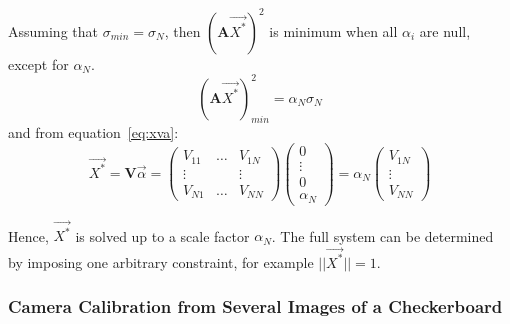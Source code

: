 \begin{algorithm}[!ht]
\begin{algorithmic}[1]
      \STATE Assuming that \(\sigma_{min} = \sigma_N\), then \((\textbf{A}\overrightarrow{X^*})^2\) is minimum when all $\alpha_i$ are null, except for $\alpha_N$.
      \begin{equation}
          (\textbf{A} \overrightarrow{X^*})_{min}^2 = \alpha_N \sigma_N
      \end{equation}
      and from equation~\ref{eq:xva}:
      \begin{equation}
          \overrightarrow{X^*} = 
          \textbf{V} \overrightarrow{\alpha} 
          = \begin{pmatrix} V_{11} & \dots & V_{1N} \\
           \vdots &  & \vdots \\
          V_{N1} & \dots & V_{NN}\end{pmatrix} \begin{pmatrix}0 \\ \vdots \\0 \\\alpha_N\end{pmatrix} 
          = \alpha_N \begin{pmatrix}V_{1N} \\ \vdots \\V_{NN}\end{pmatrix} 
      \end{equation} 
  
      \STATE Hence, $\overrightarrow{X^*}$ is solved up to a scale factor $\alpha_N$. The full system can be determined by imposing one arbitrary constraint, for example $||\overrightarrow{X^*}||=1$. 
  \end{algorithmic}
\end{algorithm}


\newpage
\subsubsection{Camera Calibration from Several Images of a Checkerboard} 


